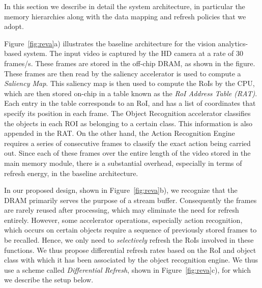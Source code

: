 In this section we describe in detail the system architecture, in particular the memory hierarchies along with the data mapping and refresh policies that we adopt.

\begin{figure*}[ht!]
\begin{minipage}[b]{0.36\linewidth}
\raggedleft
{}
\caption{\label{fig:reva}a) Baseline architecture}
\end{minipage}
\addtocounter{figure}{-1}
\begin{minipage}[b]{0.37\linewidth}
\centering
{}
\caption{\label{fig:reva}b) Architecture of Proposed System}
\end{minipage}
\addtocounter{figure}{-1}
\begin{minipage}[b]{0.25\linewidth}
\raggedright
{}
\caption{\label{fig:reva}c) Design of REVA block}
\end{minipage}
\end{figure*}


Figure~\ref{fig:reva}a) illustrates the baseline architecture for the vision analytics-based system. The input video is captured by the HD camera at a rate of 30 frames/s. 
These frames are stored in the off-chip DRAM, as shown in the figure. These frames are then read by the saliency accelerator is used to compute a \emph{Saliency Map}. This saliency map is then used to compute the RoIs by the CPU, which are then stored on-chip in a table known as the \emph{RoI Address Table (RAT)}. Each entry in the table corresponds to an RoI, and has a list of coordinates that specify its position in each frame. 
The Object Recognition accelerator classifies the objects in each ROI as belonging to a certain class. This information is also appended in the RAT.
On the other hand, the Action Recognition Engine requires a series of consecutive frames to classify the exact action being carried out. 
Since each of these frames over the entire length of the video stored in the main memory module, there is a substantial overhead, especially in terms of refresh energy, in the baseline architecture. 

In our proposed design, shown in Figure~\ref{fig:reva}b), we recognize that the DRAM primarily serves the purpose of a stream buffer. Consequently the frames are rarely reused after processing, which may eliminate the need for refresh entirely. 
However, some accelerator operations, especially action recognition, which occurs on certain objects require a sequence of previously stored frames to be recalled. Hence, we only need to \emph{selectively} refresh the RoIs involved in these functions. We thus propose differential refresh rates based on the RoI and object class with which it has been associated by the object recognition engine.
We thus use a scheme called \emph{Differential Refresh}, shown in Figure~\ref{fig:reva}c), for which we describe the setup below.

